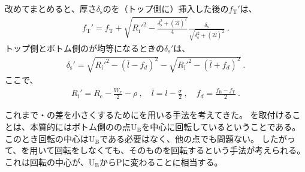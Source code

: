 \begin{hosoku}
改めてまとめると、厚さ$\delta_\mathrm s$の\Spacer を（トップ側に）挿入した後の\TopAlocationLength$f_\mathrm T'$は、
\begin{align*}
  f_\mathrm T'
  = f_\mathrm T+\sqrt{R_\mathrm i'^2-\frac{\delta_\mathrm s^2+(2\bar l)^2}4}\frac{\delta_\mathrm s}{\sqrt{\delta_\mathrm s^2+(2\bar l)^2}}\ .
\end{align*}
トップ側とボトム側の\AlocationLength が均等になるときの\SpacerThickness$\delta_\mathrm s'$は、
\begin{align*}
  \delta_\mathrm s' = \sqrt{R_\mathrm i'^2-(\bar l-f_d)^2}-\sqrt{R_\mathrm i'^2-(\bar l+f_d)^2}\ .
\end{align*}
ここで、
\begin{align*}
  R_\mathrm i' = R_\mathrm c-\frac{W_x}2-\rho\ ,\quad
  \bar l = l-\frac\sigma2\ ,\quad
  f_d = \frac{f_\mathrm B-f_\mathrm T}2\ .
\end{align*}
\end{hosoku}



\clearpage
これまで\TopAlocationLength・\BottomAlocationLength の差を小さくするために\Spacer を用いる手法を考えてきた。
\Spacer を取付けることは、本質的にはボトム側の\ReceiverPlate の点U$_\mathrm B$を中心に回転しているということである。
このとき回転の中心はU$_\mathrm B$である必要はなく、他の点でも問題ない。
したがって、\Spacer を用いて回転をしなくても、\Table そのものを回転するという手法が考えられる。
これは回転の中心が、\ReceiverPlateCenter U$_\mathrm B$から\textbf{\TableCenter}Pに変わることに相当する。

